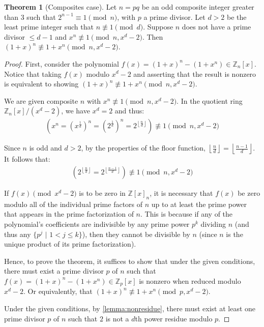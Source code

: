 \documentclass{article}
\theoremstyle{plain}
\theoremstyle{definition}
\newtheorem{theorem}{Theorem}
\begin{document}
\begin{theorem}[Composites case] \label{theorem:composites}
Let $n = pq$ be an odd composite integer greater than $3$ such that $2^{n-1} \equiv 1 \pmod{n}$, with $p$ a prime divisor. Let $d > 2$ be the least prime integer such that $n \not\equiv 1 \pmod{d}$. Suppose $n$ does not have a prime divisor $\leq d-1$ and $x^n \not\equiv 1 \pmod{n, x^d-2}$. Then $(1 + x)^n \not\equiv 1 + x^n \pmod{n, x^d-2}$.
\end{theorem}
\begin{proof}
First, consider the polynomial $f(x) = (1 + x)^n - (1 + x^n) \in \mathbb{Z}_n[x]$. Notice that taking $f(x)$ modulo $x^d - 2$ and asserting that the result is nonzero is equivalent to showing $(1 + x)^n \not\equiv 1 + x^n \pmod{n, x^d-2}$.

We are given composite $n$ with $x^n \not\equiv 1 \pmod{n, x^d-2}$. In the quotient ring $\mathbb{Z}_n[x]/(x^d-2)$, we have $x^d = 2$ and thus:
\begin{align}
    \left(x^n = (x^{\frac{1}{d}})^n = (2^{\frac{1}{d}})^n = 2^{\left\lfloor\frac{n}{d}\right\rfloor}\right) \not\equiv 1 \pmod{n,x^d-2}
\end{align}

Since $n$ is odd and $d > 2$, by the properties of the floor function, $\left\lfloor\frac{n}{d}\right\rfloor = \left\lfloor\frac{n-1}{d}\right\rfloor$. It follows that:
\begin{align}
    \left(2^{\left\lfloor\frac{n}{d}\right\rfloor} = 2^{\left\lfloor\frac{n-1}{d}\right\rfloor}\right) \not\equiv 1 \pmod{n,x^d-2}
\end{align}

If $f(x) \pmod{x^d-2}$ is to be zero in $\mathbb{Z}[x]_n$, it is necessary that $f(x)$ be zero modulo all of the individual prime factors of $n$ up to at least the prime power that appears in the prime factorization of $n$. This is because if any of the polynomial's coefficients are indivisible by any prime power $p^k$ dividing $n$ (and thus any $\{ p^j \text{ | } 1 < j \leq k \}$), then they cannot be divisible by $n$ (since $n$ is the unique product of its prime factorization).

Hence, to prove the theorem, it suffices to show that under the given conditions, there must exist a prime divisor $p$ of $n$ such that $f(x) = (1 + x)^n - (1 + x^n) \in \mathbb{Z}_p[x]$ is nonzero when reduced modulo $x^d - 2$. Or equivalently, that $(1 + x)^n \not\equiv 1 + x^n \pmod{p, x^d-2}$.

Under the given conditions, by \cref{lemma:nonresidue}, there must exist at least one prime divisor $p$ of $n$ such that $2$ is not a $d$th power residue modulo $p$.


\end{proof}
\end{document}

